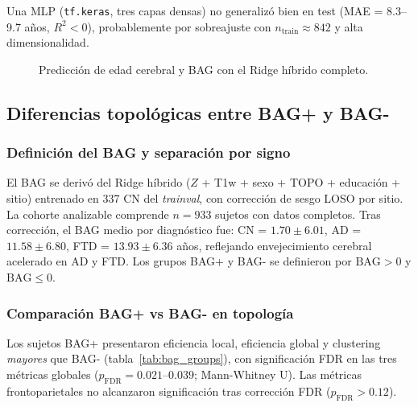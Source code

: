 \documentclass[12pt,a4paper]{article}
\begin{document}
Una MLP (\texttt{tf.keras}, tres capas densas) no generalizó bien en test (MAE = 8.3--9.7 años,
$R^2 < 0$), probablemente por sobreajuste con $n_{\text{train}} \approx 842$ y alta dimensionalidad.

\begin{figure}[H]
  \centering
  \caption{Predicción de edad cerebral y BAG con el Ridge híbrido completo.}
  \label{fig:bag_pred}
\end{figure}

\subsection{Diferencias topológicas entre BAG+ y BAG-}

\subsubsection{Definición del BAG y separación por signo}

El BAG se derivó del Ridge híbrido ($Z$ + T1w + sexo + TOPO + educación + sitio) entrenado en
337 CN del \emph{trainval}, con corrección de sesgo LOSO por sitio. La cohorte analizable
comprende $n = 933$ sujetos con datos completos. Tras corrección, el BAG medio por diagnóstico
fue: CN = $1.70 \pm 6.01$, AD = $11.58 \pm 6.80$, FTD = $13.93 \pm 6.36$ años, reflejando
envejecimiento cerebral acelerado en AD y FTD. Los grupos BAG+ y BAG- se definieron por
$\text{BAG} > 0$ y $\text{BAG} \leq 0$.

\subsubsection{Comparación BAG+ vs BAG- en topología}

Los sujetos BAG+ presentaron eficiencia local, eficiencia global y clustering \emph{mayores}
que BAG- (tabla~\ref{tab:bag_groups}), con significación FDR en las tres métricas globales
($p_{\text{FDR}} = 0.021$--$0.039$; Mann-Whitney U). Las métricas frontoparietales no
alcanzaron significación tras corrección FDR ($p_{\text{FDR}} > 0.12$).
\end{document}
